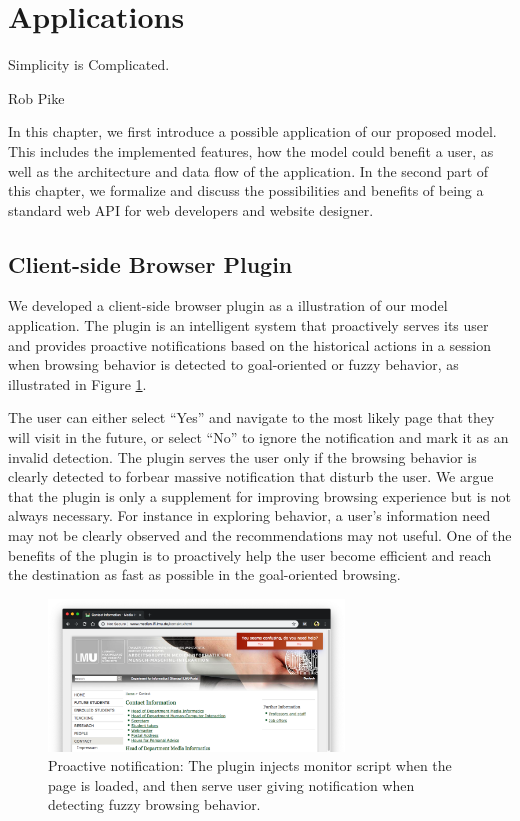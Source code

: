 \section{Applications}
\label{ch:app}

\epigraph{Simplicity is Complicated.}{Rob Pike}

In this chapter, we first introduce a possible application of our proposed model.
This includes the implemented features, how the model could benefit a user, 
as well as the architecture and data flow of the application.
In the second part of this chapter, we formalize and discuss 
the possibilities and benefits of being a standard web API for web developers 
and website designer.

\subsection{Client-side Browser Plugin}
\label{sec:plugin}

We developed a client-side browser plugin as a illustration of our model application.
The plugin is an intelligent system that proactively serves its user
and provides proactive notifications based on the historical actions in a session
when browsing behavior is detected to goal-oriented or fuzzy behavior, 
as illustrated in Figure \ref{fig:proactive-noti}.

The user can either select ``Yes'' and navigate to the most likely page that they 
will visit in the future, or select ``No'' to ignore the notification and mark it as an invalid detection.
The plugin serves the user only if the browsing behavior is clearly detected 
to forbear massive notification that disturb the user. 
We argue that the plugin is only a supplement for improving
browsing experience but is not always necessary. For instance in exploring behavior, 
a user's information need may not be clearly observed and the recommendations may not 
useful. 
One of the benefits of the plugin is to proactively help the user become efficient
and reach the destination as fast as possible in the goal-oriented browsing.

\begin{figure}[H]
    \centering
    \includegraphics[width=0.7\textwidth]{figures/proactive-noti}
    \caption{Proactive notification:
    The plugin injects monitor script when the page is loaded, and then serve user giving
    notification when detecting fuzzy browsing behavior.}
    \label{fig:proactive-noti}
\end{figure}

